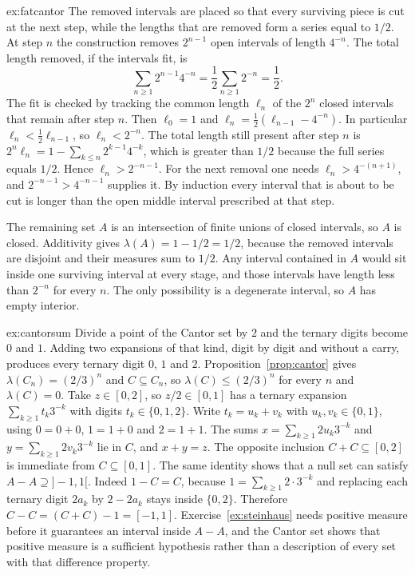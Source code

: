 \begin{solution}{ex:fatcantor}
\idea The removed intervals are placed so that every surviving piece is cut at the next step, while the lengths that are removed form a series equal to $1/2$.
\writeup At step $n$ the construction removes $2^{n-1}$ open intervals of length $4^{-n}$.
The total length removed, if the intervals fit, is
\[
\sum_{n\ge1}2^{n-1}4^{-n}=\frac12\sum_{n\ge1}2^{-n}=\frac12.
\]
The fit is checked by tracking the common length $\ell_n$ of the $2^n$ closed intervals that remain after step $n$.
Then $\ell_0=1$ and $\ell_n=\frac12(\ell_{n-1}-4^{-n})$.
In particular $\ell_n<\frac12\ell_{n-1}$, so $\ell_n<2^{-n}$.
The total length still present after step $n$ is $2^n\ell_n=1-\sum_{k\le n}2^{k-1}4^{-k}$, which is greater than $1/2$ because the full series equals $1/2$.
Hence $\ell_n>2^{-n-1}$.
For the next removal one needs $\ell_n>4^{-(n+1)}$, and $2^{-n-1}>4^{-n-1}$ supplies it.
By induction every interval that is about to be cut is longer than the open middle interval prescribed at that step.

The remaining set $A$ is an intersection of finite unions of closed intervals, so $A$ is closed.
Additivity gives $\lambda(A)=1-1/2=1/2$, because the removed intervals are disjoint and their measures sum to $1/2$.
Any interval contained in $A$ would sit inside one surviving interval at every stage, and those intervals have length less than $2^{-n}$ for every $n$.
The only possibility is a degenerate interval, so $A$ has empty interior.
\end{solution}

\begin{solution}{ex:cantorsum}
\idea Divide a point of the Cantor set by $2$ and the ternary digits become $0$ and $1$.
Adding two expansions of that kind, digit by digit and without a carry, produces every ternary digit $0$, $1$ and $2$.
\writeup Proposition~\ref{prop:cantor} gives $\lambda(C_n)=(2/3)^n$ and $C\subseteq C_n$, so $\lambda(C)\le(2/3)^n$ for every $n$ and $\lambda(C)=0$.
Take $z\in[0,2]$, so $z/2\in[0,1]$ has a ternary expansion $\sum_{k\ge1}t_k 3^{-k}$ with digits $t_k\in\{0,1,2\}$.
Write $t_k=u_k+v_k$ with $u_k,v_k\in\{0,1\}$, using $0=0+0$, $1=1+0$ and $2=1+1$.
The sums $x=\sum_{k\ge1}2u_k 3^{-k}$ and $y=\sum_{k\ge1}2v_k 3^{-k}$ lie in $C$, and $x+y=z$.
The opposite inclusion $C+C\subseteq[0,2]$ is immediate from $C\subseteq[0,1]$.
The same identity shows that a null set can satisfy $A-A\supseteq]-1,1[$.
Indeed $1-C=C$, because $1=\sum_{k\ge1}2\cdot 3^{-k}$ and replacing each ternary digit $2a_k$ by $2-2a_k$ stays inside $\{0,2\}$.
Therefore $C-C=(C+C)-1=[-1,1]$.
Exercise~\ref{ex:steinhaus} needs positive measure before it guarantees an interval inside $A-A$, and the Cantor set shows that positive measure is a sufficient hypothesis rather than a description of every set with that difference property.
\end{solution}

